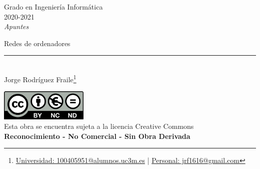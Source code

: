 \documentclass[12pt, twoside, openright]{report} %
\begin{document}
	
\begin{titlepage}
	\begin{sffamily}
	\color{azulUC3M}
	\begin{center}
		\begin{figure}[H] %
		\end{figure}
		\vspace{2.5cm}
		\begin{Large}
			Grado en Ingeniería Informática\\			
			2020-2021\\
			\vspace{2cm}		
			\textsl{Apuntes}\\
			\bigskip
		\end{Large}
		 	{\Huge Redes de ordenadores}\\
		 	\vspace*{0.5cm}
	 		\rule{10.5cm}{0.1mm}\\
			\vspace*{0.9cm}
			{\LARGE Jorge Rodríguez Fraile\footnote{\href{mailto:100405951@alumnos.uc3m.es}{Universidad: 100405951@alumnos.uc3m.es}  |  \href{mailto:jrf1616@gmail.com}{Personal: jrf1616@gmail.com}}}\\ 
			\vspace*{1cm}
	\end{center}
	\vfill
	\color{black}
		\includegraphics[width=4.2cm]{img/creativecommons.png}\\
		Esta obra se encuentra sujeta a la licencia Creative Commons\\ \textbf{Reconocimiento - No Comercial - Sin Obra Derivada}
	\end{sffamily}
\end{titlepage}


\tableofcontents
\thispagestyle{fancy}
\end{document}

